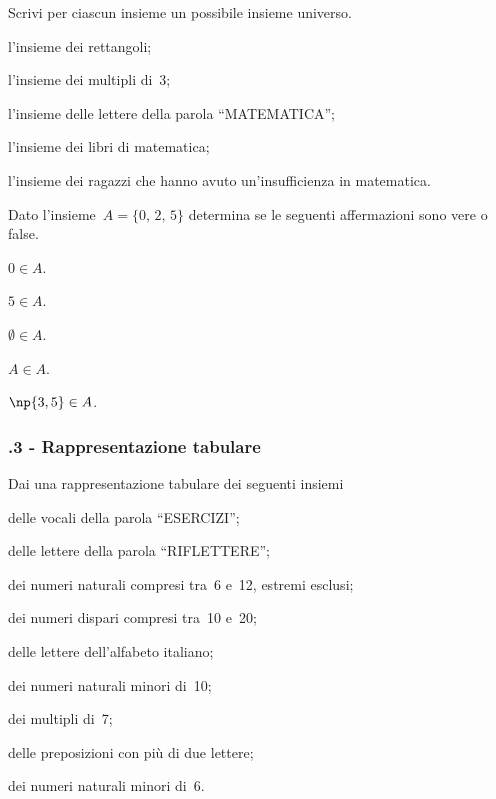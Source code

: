 \begin{esercizio}
\label{ese:\thechapter.13}
Scrivi per ciascun insieme un possibile insieme universo.
\begin{enumeratea}
\item l'insieme dei rettangoli;
\item l'insieme dei multipli di~3;
\item l'insieme delle lettere della parola ``MATEMATICA'';
\item l'insieme dei libri di matematica;
\item l'insieme dei ragazzi che hanno avuto un'insufficienza in matematica.
\end{enumeratea}
\end{esercizio}

\begin{esercizio}
\label{ese:\thechapter.14}
Dato l'insieme~$A = \{\text{0, 2, 5}\}$ determina se le seguenti affermazioni sono vere o false.
\TabPositions{2.5cm}
\begin{enumeratea}
\item $0\in A$. \tab\boxV\quad\boxF
\item $5\in A$. \tab\boxV\quad\boxF
\item $\emptyset \in A$. \tab\boxV\quad\boxF
\item $A\in A$. \tab\boxV\quad\boxF
\item $\np{3,5}\in A$. \tab\boxV\quad\boxF
\end{enumeratea}
\end{esercizio}

\subsubsection*{\thechapter.3 - Rappresentazione tabulare}

\begin{esercizio}
\label{ese:\thechapter.15}
Dai una rappresentazione tabulare dei seguenti insiemi
\begin{enumeratea}
 \item delle vocali della parola ``ESERCIZI'';
 \item delle lettere della parola ``RIFLETTERE'';
 \item dei numeri naturali compresi tra~6 e~12, estremi esclusi;
 \item dei numeri dispari compresi tra~10 e~20;
 \item delle lettere dell'alfabeto italiano;
 \item dei numeri naturali minori di~10;
 \item dei multipli di~7;
 \item delle preposizioni con più di due lettere;
 \item dei numeri naturali minori di~6.
\end{enumeratea}
\end{esercizio}


